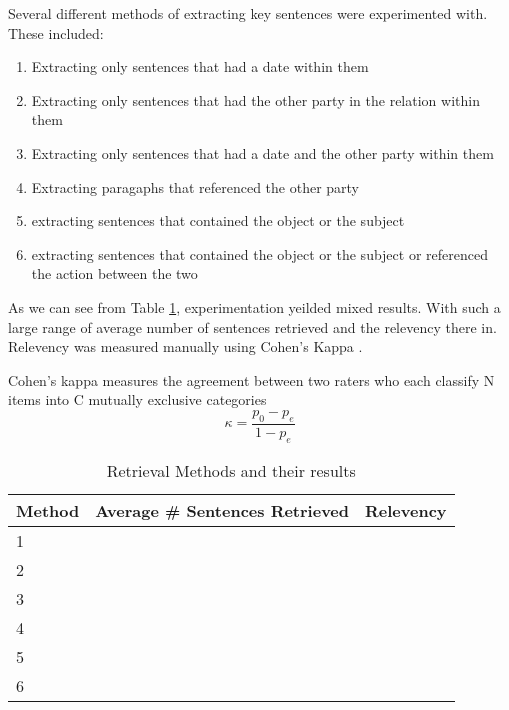 \documentclass[bsc,frontabs,twoside,singlespacing,parskip,deptreport]{infthesis}     %
\begin{document}
Several different methods of extracting key sentences were experimented with.
These included:
\begin{enumerate}
\item Extracting only sentences that had a date within them
\item Extracting only sentences that had the other party in the relation within them
\item Extracting only sentences that had a date and the other party within them
\item Extracting paragaphs that referenced the other party
  \item extracting sentences that contained the object or the subject 
  \item extracting sentences that contained the object or the subject or referenced the action between the two 
  \end{enumerate}


As we can see from Table \ref{table:retrieval}, experimentation yeilded mixed results.
With such a large range of average number of sentences retrieved and the relevency there in.
Relevency was measured manually using Cohen's Kappa \cite{wood2007understanding}.

Cohen's kappa measures the agreement between two raters who each classify N items into C mutually exclusive categories
\begin{equation}
  \kappa = \frac{p_{0} - p_{e}}{1 - p_{e}}
  \end{equation}

\begin{table}[h]
\centering
\caption{Retrieval Methods and their results}
\label{table:retrieval}
\begin{tabular}{|l|l|l|}
  \hline
Method & Average \# Sentences Retrieved & Relevency \\
\hline
1      &                                &           \\
2      &                                &           \\
3      &                                &           \\
4      &                                &           \\
5      &                                &           \\
6      &                                &           \\        
\hline
\end{tabular}
\end{table}
\end{document}
